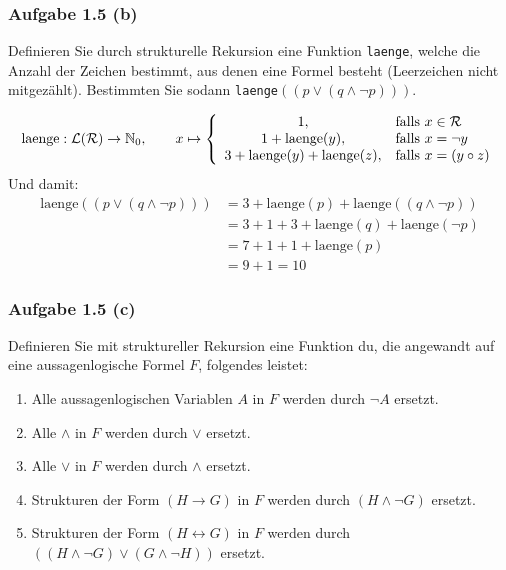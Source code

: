 \subsubsection{Aufgabe 1.5 (b)}
Definieren Sie durch strukturelle Rekursion eine Funktion \texttt{laenge}, welche die Anzahl der Zeichen bestimmt, aus denen eine Formel besteht (Leerzeichen nicht mitgezählt). 
Bestimmten Sie sodann \texttt{laenge}$((p \vee (q \wedge \neg p)))$.

\begin{lösung}
	\begin{align*}
		\text{laenge}:\mathcal{L}(\mathcal{R})\to\mathbb{N}_0,\qquad x\mapsto \left\lbrace\begin{array}{cl}
			1, & \text{falls } x\in\mathcal{R}\\
			1+\text{laenge}(y), & \text{falls } x=\neg y\\
			3+\text{laenge}(y)+\text{laenge}(z), & \text{falls } x=(y\circ z)
		\end{array}\right.
	\end{align*}
	Und damit:
	\begin{align*}
		\text{laenge}((p\vee(q\wedge\neg p))) 
		&=3+\text{laenge}(p)+\text{laenge}((q\wedge\neg p))\\
		&=3+1+3+\text{laenge}(q)+\text{laenge}(\neg p)\\
		&=7 + 1 + 1+ \text{laenge}(p)\\
		&=9+1=10
	\end{align*}
\end{lösung}

\subsubsection{Aufgabe 1.5 (c)}
Definieren Sie mit struktureller Rekursion eine Funktion du, die angewandt auf
eine aussagenlogische Formel $F$, folgendes leistet:
\begin{enumerate}[label=(\roman*)]
	\item  Alle aussagenlogischen Variablen $A$ in $F$ werden durch $\neg A$ ersetzt.
	\item Alle $\wedge$ in $F$ werden durch $\vee$ ersetzt.
	\item Alle $\vee$ in $F$ werden durch $\wedge$ ersetzt.
	\item Strukturen der Form $(H \to G)$ in $F$ werden durch $(H \wedge\neg G)$ ersetzt.
	\item Strukturen der Form $(H \leftrightarrow G)$ in $F$ werden durch $((H \wedge\neg G)\vee (G\wedge\neg H))$ ersetzt.
\end{enumerate}

